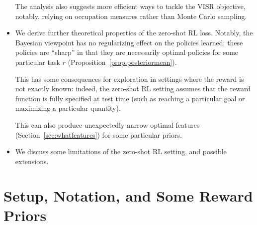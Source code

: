 \documentclass[11pt,a4paper]{article}
\newcommand{\TODO}[1]{{\color{red} TODO: {#1}}}
\begin{document}
\begin{itemize}
The analysis also suggests more efficient ways to tackle the VISR
objective, notably, relying on occupation measures rather than Monte
Carlo sampling.

\item We derive further theoretical properties of the zero-shot RL loss.
Notably, the Bayesian viewpoint has no regularizing effect on the
policies learned: these policies are ``sharp'' in that they are
necessarily optimal policies for some particular task $r$
(Proposition~\ref{prop:posteriormean}).

This has some consequences for exploration in settings where the reward
is not exactly known: indeed, the zero-shot RL setting assumes that the
reward function is fully specified at test time (such as reaching a
particular goal or maximizing a particular quantity).

This can also produce unexpectedly narrow optimal features
(Section~\ref{sec:whatfeatures}) for some particular priors.

\item We discuss some limitations of the zero-shot RL setting, and
possible extensions.

\end{itemize}

% 


\section{Setup, Notation, and Some Reward Priors}
\end{document}
